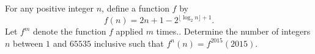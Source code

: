 For any positive integer $n$, define a function $f$ by \[f(n)=2n+1-2^{\lfloor\log_2n\rfloor+1}.\] Let $f^m$ denote the function $f$ applied $m$ times.. Determine the number of integers $n$ between $1$ and $65535$ inclusive such that $f^n(n)=f^{2015}(2015).$

